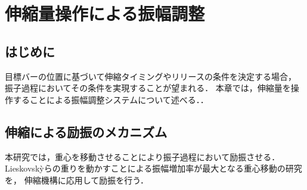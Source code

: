 \chapter[伸縮量操作による振幅調整]%
{伸縮量操作による振幅調整}
        \section{はじめに}

        目標バーの位置に基づいて伸縮タイミングやリリースの条件を決定する場合，
        振子過程においてその条件を実現することが望まれる．
        本章では，伸縮量を操作することによる振幅調整システムについて述べる．．
          
        \section{伸縮による励振のメカニズム}

          本研究では，重心を移動させることにより振子過程において励振させる．
          Lieskovsk{\`y}らの重りを動かすことによる振幅増加率が最大となる重心移動の研究\cite{lieskovsky2023optimal}を，
          伸縮機構に応用して励振を行う．
          
